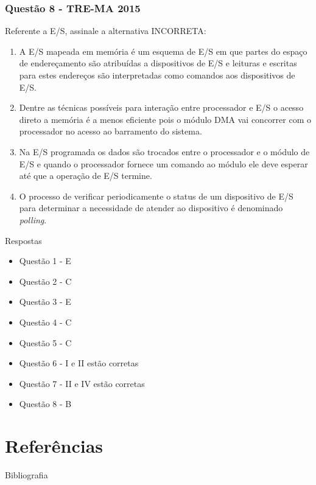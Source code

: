 \documentclass[aspectratio=169,
				xcolor=table]{beamer}
\begin{document}
	\begin{frame}
		\frametitle{Questão 8 - TRE-MA 2015}
		Referente a E/S, assinale a alternativa INCORRETA:
		\vspace{.5em}
		\begin{enumerate}[a]
			\normalsize
			\item A E/S mapeada em memória é um esquema de E/S em que partes do espaço de endereçamento são atribuídas a dispositivos de E/S e leituras e escritas para estes endereços são interpretadas como comandos aos dispositivos de E/S.
			\item Dentre as técnicas possíveis para interação entre processador e E/S o acesso direto a memória é a menos eficiente pois o módulo DMA vai concorrer com o processador no acesso ao barramento do sistema.
			\item Na E/S programada os dados são trocados entre o processador e o módulo de E/S e quando o processador fornece um comando ao módulo ele deve esperar até que a operação de E/S termine.
			\item O processo de verificar periodicamente o status de um dispositivo de E/S para determinar a necessidade de atender ao dispositivo é denominado \textit{polling}.		
		\end{enumerate}
	\end{frame}

	\begin{frame}{Respostas}
		\begin{itemize}
			\item Questão 1 - E
			\item Questão 2 - C
			\item Questão 3 - E
			\item Questão 4 - C
			\item Questão 5 - C
			\item Questão 6 - I e II estão corretas
			\item Questão 7 - II e IV estão corretas
			\item Questão 8 - B
		
		\end{itemize}
	\end{frame}
			
	\section{Referências}
	\begin{frame}{Bibliografia}
		\nocite{Delgado2017}
		\nocite{Stallings2010}
    	
    	
    	
	
	\end{frame}
\end{document}
